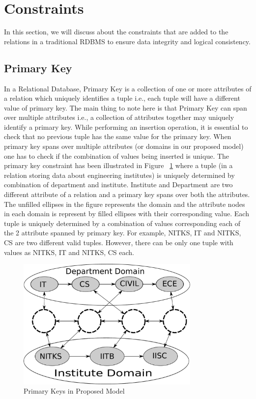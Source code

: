 \documentclass[12pt, oneside]{book}
\begin{document}
\section{Constraints}
In this section, we will discuss about the constraints that are added to the relations in a traditional RDBMS to ensure data integrity and logical consistency.
\subsection{Primary Key}
In a Relational Database, Primary Key is a collection of one or more attributes of a relation which uniquely identifies a tuple i.e., each tuple will have a different value of primary key. The main thing to note here is that Primary Key can span over multiple attributes i.e., a collection of attributes together may uniquely identify a primary key. While performing an insertion operation, it is essential to check that no previous tuple has the same value for the primary key. When primary key spans over multiple attributes (or domains in our proposed model) one has to check if the combination of values being inserted is unique. The primary key constraint has been illustrated in Figure ~\ref{fig:primary_key} where a tuple (in a relation storing data about engineering institutes) is uniquely determined by combination of department and institute. Institute and Department are two different attribute of a relation and a primary key spans over both the attributes. The unfilled ellipses in the figure represents the domain and the attribute nodes in each domain is represent by filled ellipses with their corresponding value. Each tuple is uniquely determined by a combination of values corresponding each of the 2 attribute spanned by primary key. For example, {NITKS, IT} and {NITKS, CS} are two different valid tuples. However, there can be only one tuple with values as {NITKS, IT} and {NITKS, CS} each.
\begin{figure}
 \centering
 \includegraphics[width=0.8\textwidth]{pics/primary_key.pdf}
 \caption{Primary Keys in Proposed Model}
 \label{fig:primary_key}
\end{figure}
\end{document}
